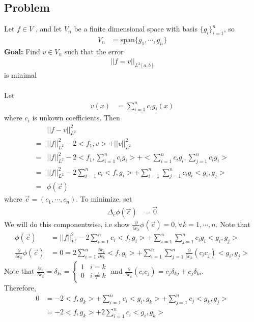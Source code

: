 \documentclass[11pt,oneside]{book}
\theoremstyle{break}
\theoremstyle{break}
\newcommand{\spa}{\text{span}}
\begin{document}
 \subsection[Problem]{Problem}
 Let $f\in V$ , and let $V_n$ be a finite dimensional space with basis $\{g_i\}_{i=1}^n$, so \begin{align*}
 V_n&=\spa\{g_1,\cdots,g_n\}
 \end{align*}
 \textbf{Goal:} Find $v\in V_n$ such that the error \begin{align*}
 ||f=v||_{L^2[a,b]}
 \end{align*}
  is minimal\\
  \hfill\\
  Let \begin{align*}
  v(x)&=\sum_{i=1}^nc_ig_i(x)
  \end{align*}
  where $c_i$ is unkown coefficients. Then \begin{align*}
  &||f-v||^2_{L^2}\\
  =&||f||_{L^2}^2-2<f_1,v>+||v||_{L^2}^2\\
  =&||f||_{L^2}^2-2<f_1,\sum_{i=1}^n c_ig_i>+<\sum_{i=1}^nc_ig_i,\sum_{j=1}^nc_ig_i>\\
  =&||f||^2_{L^2}-2\sum_{i=1}^nc_i<f,g_i>+\sum_{i=1}^n\sum_{j=1}^nc_ig_i<g_i,g_j>\\
  =&\phi(\vec{c})
  \end{align*}
  where $\vec{c}=(c_1,\cdots,c_n).$ To minimize, set \begin{align*}
  \Delta_c\phi(\vec{c})&=\vec{0}
  \end{align*}
  We will do this componentwise, i.e show $\frac{\partial}{\partial c_k}\phi(\vec{c})=0,\forall k=1,\cdots,n$. Note that \begin{align*}
  \phi(\vec{c})&=||f||^2_{L^2}-2\sum_{i=1}^nc_i<f,g_i>+\sum_{i=1}^n\sum_{j=1}^nc_ig_i<g_i,g_j>\\
  \frac{\partial}{\partial c_k}\phi(\vec{c})&=0=2\sum_{i=1}^n \frac{\partial c_i}{\partial c_k}<f,g_i>+\sum_{i=1}^n\sum_{j=1}^n\frac{\partial}{\partial c_k} (c_ic_j)<g_i,g_j>
  \end{align*}
  Note that $\frac{\partial c_i}{\partial c_k}=\delta_{ki}=\begin{cases}
  1 &i=k\\
  0 &i\neq k
  \end{cases}
  $ and $\frac{\partial}{\partial c_k}(c_ic_j)=c_j\delta_{kj}+c_j\delta_{ki}$.\\
  Therefore, \begin{align*}
  0&=-2<f,g_k>+\sum_{i=1}^nc_i<g_i,g_k>+\sum_{j=1}^nc_j<g_k,g_j>\\
  &=-2<f,g_k>+2\sum_{i=1}^nc_i<g_i,g_k>
  \end{align*}
\end{document}

